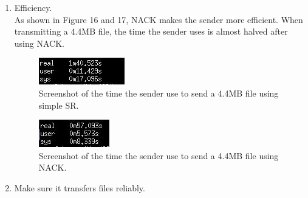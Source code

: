\documentclass[a4paper]{article}
\begin{document}
\begin{enumerate}[A]

\item Efficiency.\\
As shown in Figure 16 and 17, NACK makes the sender more efficient. When transmitting a 4.4MB file, the time the sender uses is almost halved after using NACK.
\begin{figure}[htbp]
\centering
\includegraphics[scale=2]{16.jpg}
\caption{Screenshot of the time the sender use to send a 4.4MB file using simple SR.}
\end{figure}

\begin{figure}[htbp]
\centering
\includegraphics[scale=2]{18.jpg}
\caption{Screenshot of the time the sender use to send a 4.4MB file using NACK.}
\end{figure}

\item Make sure it transfers files reliably.\\

\end{enumerate}
\end{document}
